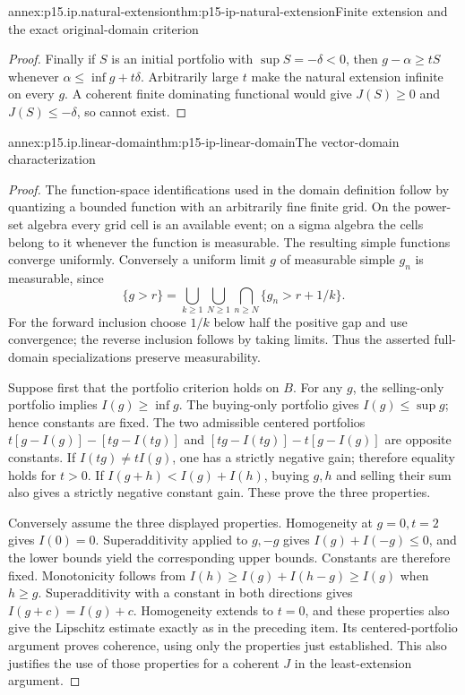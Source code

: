 \begin{annexitem}{annex:p15.ip.natural-extension}{thm:p15-ip-natural-extension}{Finite extension and the exact original-domain criterion}
\begin{proof}
Finally if \(S\) is an initial portfolio with \(\sup S=-\delta<0\),
then \(g-\alpha\geq tS\) whenever
\(\alpha\leq\inf g+t\delta\). Arbitrarily large \(t\) make the
natural extension infinite on every \(g\). A coherent finite
dominating functional would give \(J(S)\geq0\) and
\(J(S)\leq-\delta\), so cannot exist.
\end{proof}
\end{annexitem}

\begin{annexitem}{annex:p15.ip.linear-domain}{thm:p15-ip-linear-domain}{The vector-domain characterization}
\begin{proof}
The function-space identifications used in the domain definition follow
by quantizing a bounded function with an arbitrarily fine finite grid.
On the power-set algebra every grid cell is an available event; on a
sigma algebra the cells belong to it whenever the function is measurable.
The resulting simple functions converge uniformly. Conversely a uniform
limit \(g\) of measurable simple \(g_n\) is measurable, since
\[
 \{g>r\}=\bigcup_{k\geq1}\bigcup_{N\geq1}
                 \bigcap_{n\geq N}\{g_n>r+1/k\}.
\]
For the forward inclusion choose \(1/k\) below half the positive
gap and use convergence; the reverse inclusion follows by taking limits.
Thus the asserted full-domain specializations preserve measurability.

Suppose first that the portfolio criterion holds on \(B\).
For any \(g\), the selling-only portfolio implies \(I(g)\geq\inf g\).
The buying-only portfolio gives \(I(g)\leq\sup g\); hence constants
are fixed. The two admissible centered portfolios
\(t[g-I(g)]-[tg-I(tg)]\) and
\([tg-I(tg)]-t[g-I(g)]\) are opposite constants.
If \(I(tg)\ne tI(g)\), one has a strictly negative gain;
therefore equality holds for \(t>0\). If
\(I(g+h)<I(g)+I(h)\), buying \(g,h\) and selling their sum also
gives a strictly negative constant gain. These prove the three properties.

Conversely assume the three displayed properties. Homogeneity at
\(g=0,t=2\) gives \(I(0)=0\). Superadditivity applied to \(g,-g\)
gives \(I(g)+I(-g)\leq0\), and the lower bounds yield the corresponding
upper bounds. Constants are therefore fixed. Monotonicity follows from
\(I(h)\geq I(g)+I(h-g)\geq I(g)\) when \(h\geq g\).
Superadditivity with a constant in both directions gives
\(I(g+c)=I(g)+c\). Homogeneity extends to \(t=0\), and these
properties also give the Lipschitz estimate exactly as in the preceding
item. Its centered-portfolio argument proves coherence, using only
the properties just established. This also justifies the use of those
properties for a coherent \(J\) in the least-extension argument.
\end{proof}
\end{annexitem}

